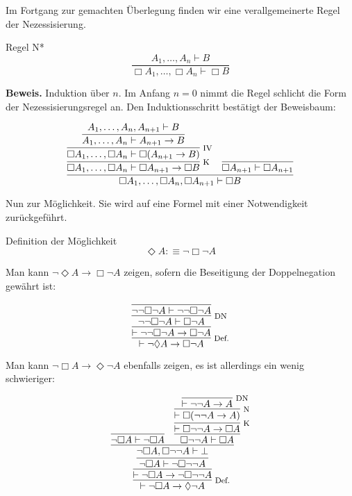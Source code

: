 \documentclass[8pt]{beamer}
\newcommand{\strong}[1]{\textsf{\textbf{#1}}}
\newcommand{\infernote}[1]{\!\text{\footnotesize #1}}
\newcommand{\cond}{\rightarrow}
\newcommand{\lnec}{\Box}
\newcommand{\lpos}{\Diamond}
\begin{document}
\begin{frame}
Im Fortgang zur gemachten Überlegung finden wir eine verallgemeinerte
Regel der Nezessisierung.
\begin{block}{Regel N*}
\[\dfrac{A_1,\ldots,A_n\vdash B}{\lnec A_1,\ldots,\lnec A_n\vdash\lnec B}\]
\end{block}\pause
\strong{Beweis.}
Induktion über $n$. Im Anfang $n=0$ nimmt die Regel schlicht die Form
der Nezessisierungsregel an. Den Induktionsschritt bestätigt der Beweisbaum:

\[
\infer{\lnec A_1,\ldots,\lnec A_n,\lnec A_{n+1}\vdash\lnec B}{
  \infer[\infernote{K}]{\lnec A_1,\ldots,\lnec A_n\vdash\lnec A_{n+1}\cond\lnec B}{
    \infer[\infernote{IV}]{\lnec A_1,\ldots,\lnec A_n\vdash\lnec (A_{n+1}\cond B)}{
      \infer{A_1,\ldots,A_n\vdash A_{n+1}\cond B}{
        A_1,\ldots,A_n,A_{n+1}\vdash B}}}
& \infer{\lnec A_{n+1}\vdash\lnec A_{n+1}}{}}
\]
\end{frame}

\begin{frame}
Nun zur Möglichkeit. Sie wird auf eine Formel mit einer
Notwendigkeit zurückgeführt.
\begin{block}{Definition der Möglichkeit}
\[\lpos A :\equiv \neg\lnec\neg A\]
\end{block}
\end{frame}

\begin{frame}
Man kann $\neg\lpos A\cond\lnec\neg A$ zeigen, sofern die Beseitigung
der Doppelnegation gewährt ist:\pause

\[
\infer[\infernote{Def.}]{\vdash\neg\lpos A\cond\lnec\neg A}{
  \infer{\vdash\neg\neg\lnec\neg A\cond\lnec\neg A}{
    \infer[\infernote{DN}]{\neg\neg\lnec\neg A\vdash\lnec\neg A}{
      \infer{\neg\neg\lnec\neg A\vdash\neg\neg\lnec\neg A}{}}}}
\]\pause

Man kann $\neg\lnec A\cond\lpos\neg A$ ebenfalls zeigen,
es ist allerdings ein wenig schwieriger:\pause

\[
\infer[\infernote{Def.}]{\vdash \neg\lnec A\cond\lpos\neg A}{
  \infer{\vdash \neg\lnec A\cond\neg\lnec\neg\neg A}{
    \infer{\neg\lnec A\vdash\neg\lnec\neg\neg A}{
      \infer{\neg\lnec A, \lnec\neg\neg A\vdash\bot}{
        \infer{\neg\lnec A\vdash\neg\lnec A}{}
      & \infer{\lnec\neg\neg A\vdash \lnec A}{
          \infer[\infernote{K}]{\vdash\lnec\neg\neg A\cond\lnec A}{
            \infer[\infernote{N}]{\vdash\lnec(\neg\neg A\cond A)}{
              \infer[\infernote{DN}]{\vdash\neg\neg A\cond A}{}}}}}}}}
\]
\end{frame}
\end{document}
